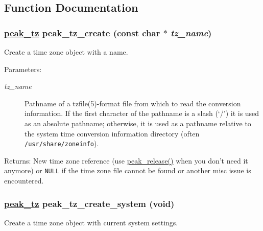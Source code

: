 \subsection{Function Documentation}
\hypertarget{group__tz_ga1}{
\subsubsection[peak\_\-tz\_\-create]{\setlength{\rightskip}{0pt plus 5cm}\hyperlink{group__tz_ga0}{peak\_\-tz} peak\_\-tz\_\-create (const char $\ast$ {\em tz\_\-name})}}
\label{group__tz_ga1}


Create a time zone object with a name. 

\begin{Desc}
\item[Parameters:]
\begin{description}
\item[{\em tz\_\-name}]Pathname of a tzfile(5)-format file from which to read the conversion information. If the first character of the pathname is a slash (`/') it is used as an absolute pathname; otherwise, it is used as a pathname relative to the system time conversion information directory (often {\tt /usr/share/zoneinfo}).\end{description}
\end{Desc}
\begin{Desc}
\item[Returns:]New time zone reference (use \hyperlink{group__alloc_ga7}{peak\_\-release()} when you don't need it anymore) or {\tt NULL} if the time zone file cannot be found or another misc issue is encountered. \end{Desc}
\hypertarget{group__tz_ga2}{
\subsubsection[peak\_\-tz\_\-create\_\-system]{\setlength{\rightskip}{0pt plus 5cm}\hyperlink{group__tz_ga0}{peak\_\-tz} peak\_\-tz\_\-create\_\-system (void)}}
\label{group__tz_ga2}


Create a time zone object with current system settings. 

